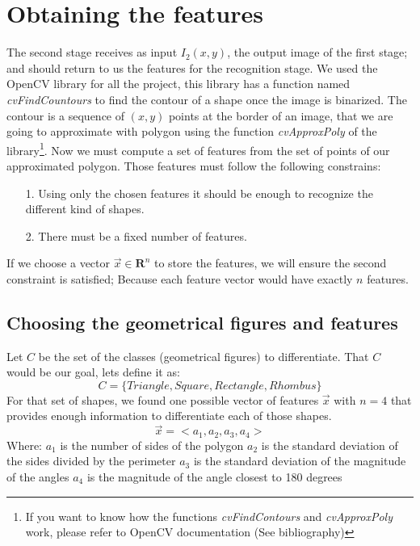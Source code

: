 \documentclass[10pt,journal]{IEEEtran}
\begin{document}
	\section{Obtaining the features}
	The second stage receives as input $I_2(x,y)$, the output image of the first
	stage; and should return to us the features for the recognition stage. We used the 
	OpenCV library for all the project, this library has a function named
	\textit{cvFindCountours} to find the contour of a shape once the image is
	binarized. The contour is a sequence of $(x,y)$ points at the border of an image,
	that we are going to approximate with polygon using the function 
	\textit{cvApproxPoly} of the library\footnote {If you want to know how the 
	functions \textit{cvFindContours} and \textit{cvApproxPoly} work, please 
	refer to OpenCV	documentation (See bibliography)}.
	Now we must compute a set of features from the set of points of our 
	approximated polygon. Those features must follow the following constrains:
	\begin{itemize}
		\item[1.] Using only the chosen features it should be enough to recognize the
			different kind of shapes.
		\item[2.] There must be a fixed number of features.
	\end{itemize}
	If we choose a vector $\vec{x} \in \mathbf{R}^n$ to store the features, we will
	ensure the second constraint is satisfied; Because each feature vector would have
	exactly $n$ features.
	
	\subsection{Choosing the geometrical figures and features}
	Let $C$ be the set of the classes (geometrical figures) to differentiate. That 
	$C$ would be our goal, lets define it as:
	\[C = \{ Triangle, Square, Rectangle, Rhombus \} \]
	For that set of shapes, we found one possible vector of features $\vec{x}$ with
	$n=4$ that provides enough information to differentiate each of those shapes.
	\[\vec{x} = <a_1,a_2,a_3,a_4> \]
	Where:\newline
	$a_1$ is the number of sides of the polygon\newline
	$a_2$ is the standard deviation of the sides divided by the perimeter\newline
	$a_3$ is the standard deviation of the magnitude of the angles\newline
	$a_4$ is the magnitude of the angle closest to 180 degrees\newline
	
\end{document}
